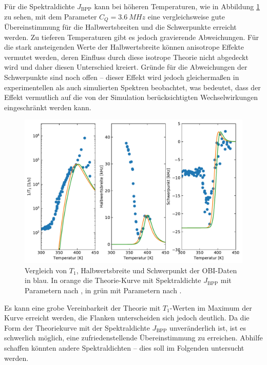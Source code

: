 Für die Spektraldichte $J_\text{BPP}$ kann bei höheren Temperaturen, wie in Abbildung \ref{fig:res:theorie_j} zu sehen, mit dem Parameter $C_Q = \SI{3.6}{MHz}$ eine vergleichsweise gute Übereinstimmung für die Halbwertsbreiten und die Schwerpunkte erreicht werden. Zu tieferen Temperaturen gibt es jedoch gravierende Abweichungen. Für die stark ansteigenden Werte der Halbwertsbreite können anisotrope Effekte vermutet werden, deren Einfluss durch diese isotrope Theorie nicht abgedeckt wird und daher diesen Unterschied kreiert. Gründe für die Abweichungen der Schwerpunkte sind noch offen -- dieser Effekt wird jedoch gleichermaßen in experimentellen als auch simulierten Spektren beobachtet, was bedeutet, dass der Effekt vermutlich auf die von der Simulation berücksichtigten Wechselwirkungen eingeschränkt werden kann.
\begin{figure}
	\begin{center}
		\includegraphics[width=.9\textwidth]{graphics/plot/OBI_J_02.pdf}
	\end{center}
	\caption{Vergleich von $T_1$, Halbwertsbreite und Schwerpunkt der OBI-Daten in blau. In orange die Theorie-Kurve mit Spektraldichte $J_\text{BPP}$ mit Parametern nach \cite{PIMENOV199793}, in grün mit Parametern nach \cite{crn_augsburg}.} \label{fig:res:theorie_j}
\end{figure}

Es kann eine grobe Vereinbarkeit der Theorie mit $T_1$-Werten im Maximum der Kurve erreicht werden, die Flanken unterscheiden sich jedoch deutlich. Da die Form der Theoriekurve mit der Spektraldichte $J_\text{BPP}$ unveränderlich ist, ist es schwerlich möglich, eine zufriedenstellende Übereinstimmung zu erreichen. Abhilfe schaffen könnten andere Spektraldichten -- dies soll im Folgenden untersucht werden.

